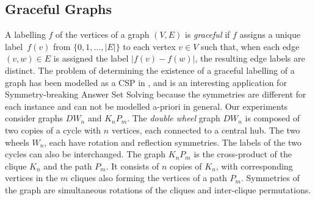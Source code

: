 \documentclass[envcountsame]{llncs}
\begin{document}
\subsection{Graceful Graphs}
A labelling $f$ of the vertices of a graph $(V,E)$ is \emph{graceful} if $f$ assigns a unique label~$f(v)$ from $\{0,1,\dots,|E|\}$ to each vertex $v \in V$ such that, when each edge $(v,w) \in E$ is assigned the label $|f(v)-f(w)|$, the resulting edge labels are distinct. The problem of determining the existence of a graceful labelling of a graph has been modelled as a CSP in \cite{pesm03a}, and is an interesting application for Symmetry-breaking Answer Set Solving because the symmetries are different for each instance and can not be modelled a-priori in general. Our experiments consider graphs $DW_n$ and $K_nP_m$. The \emph{double wheel} graph $DW_n$ is composed of two copies of a cycle with $n$ vertices, each connected to a central hub. The two wheels $W_n$, each have rotation and reflection symmetries. The labels of the two cycles can also be interchanged. The graph $K_nP_m$ is the cross-product of the clique $K_n$ and the path $P_m$. It consists of $n$ copies of $K_n$, with corresponding vertices in the $m$ cliques also forming the vertices of a path $P_m$. Symmetries of the graph are simultaneous rotations of the cliques and inter-clique permutations.
\end{document}
